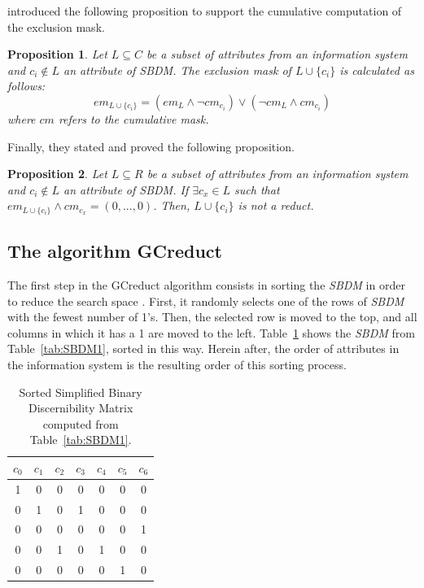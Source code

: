 \documentclass[authoryear,preprint,review,12pt]{elsarticle}
\newtheorem{proposition}{Proposition}
\begin{document}
	\cite{Lias13} introduced the following proposition to support the cumulative computation of the exclusion mask.
	
	\begin{proposition}\label{prop:cumul} 
		Let $L \subseteq C$ be a subset of attributes from an information system and $c_i \notin L$ an attribute of \textit{SBDM}.
		The exclusion mask of $L \cup \lbrace c_i\rbrace$ is calculated as follows:
		$$em_{L \cup \lbrace c_i\rbrace}=(em_L \wedge \neg cm_{c_i}) \vee (\neg cm_L \wedge cm_{c_i})$$
		where $cm$ refers to the cumulative mask.
	\end{proposition}
	
	Finally, they stated and proved the following proposition.
	
	\begin{proposition}\label{prop:exclude} 
		Let $L \subseteq R$ be a subset of attributes from an information system and $c_i \notin L$ an attribute of \textit{SBDM}.
		If $\exists c_x \in L$ such that $em_{L \cup \lbrace c_i\rbrace} \wedge cm_{c_x}=(0,...,0)$. Then, $L \cup \lbrace c_i\rbrace$	is not a reduct.
	\end{proposition}

\subsection{The algorithm GCreduct}\label{description}

	The first step in the GCreduct algorithm consists in sorting the \textit{SBDM} in order to reduce the search space \citep{Sanchez07}. First, it randomly selects one of the rows of \textit{SBDM} with the fewest number of 1's. Then, the selected row is moved to the top, and all columns in which it has a 1 are moved to the left. Table~\ref{tab:SSBDM1} shows the \textit{SBDM} from Table~\ref{tab:SBDM1}, sorted in this way. Herein after, the order of attributes in the information system is the resulting order of this sorting process.
		
	\begin{table}[htb]
		\caption{Sorted Simplified Binary Discernibility Matrix computed from Table~\ref{tab:SBDM1}.}
		\centering
		\begin{tabular}{ccccccc}\label{tab:SSBDM1}
			$c_0$ & $c_1$ & $c_2$ & $c_3$ & $c_4$ & $c_5$ & $c_6$\\
			\hline
			1&0&0&0&0&0&0\\
			0&1&0&1&0&0&0\\
			0&0&0&0&0&0&1\\
			0&0&1&0&1&0&0\\
			0&0&0&0&0&1&0\\
		\end{tabular}             
	\end{table}  
	
\end{document}
